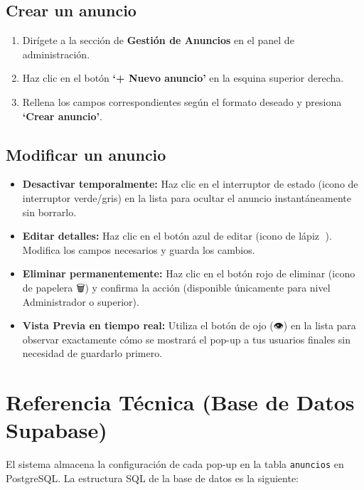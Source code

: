 \documentclass[11pt,a4paper]{article}
\begin{document}
\subsection{Crear un anuncio}
\begin{enumerate}
    \item Dirígete a la sección de \textbf{Gestión de Anuncios} en el panel de administración.
    \item Haz clic en el botón \textbf{`+ Nuevo anuncio'} en la esquina superior derecha.
    \item Rellena los campos correspondientes según el formato deseado y presiona \textbf{`Crear anuncio'}.
\end{enumerate}

\subsection{Modificar un anuncio}
\begin{itemize}
    \item \textbf{Desactivar temporalmente:} Haz clic en el interruptor de estado (icono de interruptor verde/gris) en la lista para ocultar el anuncio instantáneamente sin borrarlo.
    \item \textbf{Editar detalles:} Haz clic en el botón azul de editar (icono de lápiz 📝). Modifica los campos necesarios y guarda los cambios.
    \item \textbf{Eliminar permanentemente:} Haz clic en el botón rojo de eliminar (icono de papelera 🗑️) y confirma la acción (disponible únicamente para nivel Administrador o superior).
    \item \textbf{Vista Previa en tiempo real:} Utiliza el botón de ojo (👁️) en la lista para observar exactamente cómo se mostrará el pop-up a tus usuarios finales sin necesidad de guardarlo primero.
\end{itemize}

\newpage

\section{Referencia Técnica (Base de Datos Supabase)}
El sistema almacena la configuración de cada pop-up en la tabla \texttt{anuncios} en PostgreSQL. La estructura SQL de la base de datos es la siguiente:
\end{document}
